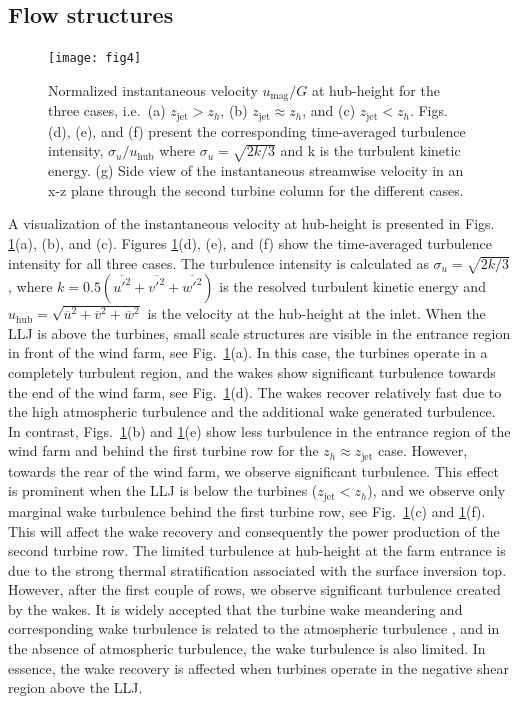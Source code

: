 \documentclass[%
 aip,
 amsmath,amssymb,
reprint,
twocolumn,%
author-numerical,%
]{revtex4-1}
\begin{document}
\subsection{Flow structures}\label{sec3.1}
\begin{figure}
 \centering
 \texttt{[image: fig4]}
 \caption{Normalized instantaneous velocity $u_\text{mag}/G$ at hub-height for the three cases, i.e.\ (a) $z_\text{jet} > z_h$, (b) $z_\text{jet}\approx z_h$, and (c) $z_\text{jet} < z_h$. Figs. (d), (e), and (f) present the corresponding time-averaged turbulence intensity, $\sigma_{u}/u_\text{hub}$ where $\sigma_{u}=\sqrt{2k/3}$ and k is the turbulent kinetic energy. (g) Side view of the instantaneous streamwise velocity in an x-z plane through the second turbine column for the different cases.}
 \label{topview}
\end{figure}
\indent A visualization of the instantaneous velocity at hub-height is presented in Figs. \ref{topview}(a), (b), and (c). Figures \ref{topview}(d), (e), and (f) show the time-averaged turbulence intensity for all three cases. The turbulence intensity is calculated as $\sigma_u=\sqrt{2k/3}$, where $k=0.5 (\overline{u'^2} +\overline{v'^2} + \overline{w'^2})$ is the resolved turbulent kinetic energy and $u_\text{hub} = \sqrt{\overline{{u}}^2 + \overline{{v}}^2 + \overline{{w}}^2}$ {\color{black} is the velocity at the hub-height at the inlet.} {\color{black} When the LLJ is above the turbines,} small scale structures are visible in the entrance region in front of the wind farm, see Fig.\ \ref{topview}(a). In this case, the turbines operate in a completely turbulent region, and the wakes show significant turbulence towards the end of the wind farm, see Fig.\ \ref{topview}(d). The wakes recover relatively fast due to the high atmospheric turbulence and the additional wake generated turbulence. {\color{black} In contrast, Figs.\ \ref{topview}(b) and \ref{topview}(e) show less turbulence in the entrance region of the wind farm and behind the first turbine row for the $z_h \approx z_\text{jet}$ case.} {\color{black} However, towards the rear of the wind farm, we observe significant turbulence. {\color{black} This effect is prominent when the LLJ is below the turbines ($z_\text{jet} < z_h$), and we observe only marginal {\color{black} wake turbulence} behind the first turbine row, see Fig.\ \ref{topview}(c) and \ref{topview}(f). This will affect the wake recovery and consequently the power production of the second turbine row. The limited turbulence at hub-height at the farm entrance is due to the strong thermal stratification associated with the surface inversion top.} However, after the first couple of rows, we observe significant turbulence created by the wakes. It is widely accepted that the turbine wake meandering and corresponding wake turbulence is related to the atmospheric turbulence \cite{mao18, lar08}, and in the absence of atmospheric turbulence, the wake turbulence is also limited. In essence, the wake recovery is affected when turbines operate in the negative shear region above the LLJ.}\\ 
\end{document}
